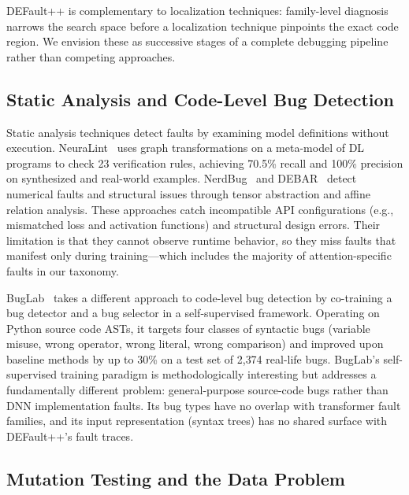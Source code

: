 DEFault++ is complementary to localization techniques: family-level diagnosis narrows the search space before a localization technique pinpoints the exact code region. We envision these as successive stages of a complete debugging pipeline rather than competing approaches.

\subsection{Static Analysis and Code-Level Bug Detection}
\label{subsec:rw_static}

Static analysis techniques detect faults by examining model definitions without execution. NeuraLint~\cite{Neuralink} uses graph transformations on a meta-model of DL programs to check 23 verification rules, achieving 70.5\% recall and 100\% precision on synthesized and real-world examples. NerdBug~\cite{nerdbug} and DEBAR~\cite{debar} detect numerical faults and structural issues through tensor abstraction and affine relation analysis. These approaches catch incompatible API configurations (e.g., mismatched loss and activation functions) and structural design errors. Their limitation is that they cannot observe runtime behavior, so they miss faults that manifest only during training---which includes the majority of attention-specific faults in our taxonomy.

BugLab~\cite{buglab} takes a different approach to code-level bug detection by co-training a bug detector and a bug selector in a self-supervised framework. Operating on Python source code ASTs, it targets four classes of syntactic bugs (variable misuse, wrong operator, wrong literal, wrong comparison) and improved upon baseline methods by up to 30\% on a test set of 2{,}374 real-life bugs. BugLab's self-supervised training paradigm is methodologically interesting but addresses a fundamentally different problem: general-purpose source-code bugs rather than DNN implementation faults. Its bug types have no overlap with transformer fault families, and its input representation (syntax trees) has no shared surface with DEFault++'s fault traces.

\subsection{Mutation Testing and the Data Problem}
\label{subsec:rw_mutation}

